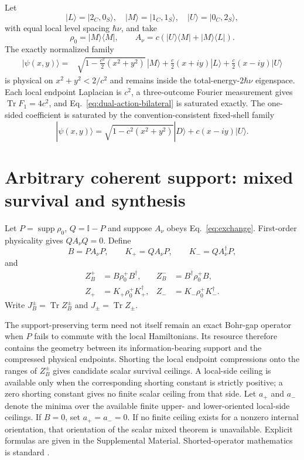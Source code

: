 \documentclass[aps,pra,preprint,nofootinbib]{revtex4-2}
\newcommand{\Tr}{\operatorname{Tr}}
\newcommand{\supp}{\operatorname{supp}}
\newcommand{\id}{\mathbb I}
\newcommand{\rhozero}{\rho_0}
\begin{document}
Let
\begin{equation}
|L\rangle=|2_C,0_S\rangle,\quad
|M\rangle=|1_C,1_S\rangle,\quad
|U\rangle=|0_C,2_S\rangle,
\end{equation}
with equal local level spacing $\hbar\nu$, and take
\begin{equation}
\rhozero=|M\rangle\!\langle M|,
\qquad
A_\nu=c(|U\rangle\!\langle M|+|M\rangle\!\langle L|).
\end{equation}
The exactly normalized family
\begin{align}
|\psi(x,y)\rangle={}&
\sqrt{1-\frac{c^2}{2}(x^2+y^2)}\,|M\rangle
+\frac c2(x+i y)|L\rangle
+\frac c2(x-i y)|U\rangle
\label{eq:bilateral-extremizer}
\end{align}
is physical on $x^2+y^2<2/c^2$ and remains inside the total-energy-$2\hbar\nu$ eigenspace. Each local endpoint Laplacian is $c^2$, a three-outcome Fourier measurement gives $\Tr F_1=4c^2$, and Eq.~\eqref{eq:dual-action-bilateral} is saturated exactly. The one-sided coefficient is saturated by the convention-consistent fixed-shell family
\begin{equation}
|\psi(x,y)\rangle
=\sqrt{1-c^2(x^2+y^2)}|D\rangle+c(x-i y)|U\rangle.
\end{equation}

\section{Arbitrary coherent support: mixed survival and synthesis}
\label{sec:mixed}

Let $P=\supp\rhozero$, $Q=\id-P$ and suppose $A_\nu$ obeys Eq.~\eqref{eq:exchange}. First-order physicality gives $QA_\nu Q=0$. Define
\begin{equation}
B=PA_\nu P,\qquad
K_+=QA_\nu P,\qquad
K_-=QA_\nu^\dagger P,
\label{eq:mixed-decomp}
\end{equation}
and
\begin{align}
Z_B^+&=B\rhozero^+B^\dagger,&Z_B^-&=B^\dagger\rhozero^+B,\\
Z_+&=K_+\rhozero^+K_+^\dagger,&Z_-&=K_-\rhozero^+K_-^\dagger.
\end{align}
Write $J_B^\pm=\Tr Z_B^\pm$ and $J_\pm=\Tr Z_\pm$.

The support-preserving term need not itself remain an exact Bohr-gap operator when $P$ fails to commute with the local Hamiltonians. Its resource therefore contains the geometry between its information-bearing support and the compressed physical endpoints. Shorting the local endpoint compressions onto the ranges of $Z_B^\pm$ gives candidate scalar survival ceilings. A local-side ceiling is available only when the corresponding shorting constant is strictly positive; a zero shorting constant gives no finite scalar ceiling from that side. Let $a_+$ and $a_-$ denote the minima over the available finite upper- and lower-oriented local-side ceilings. If $B=0$, set $a_+=a_-=0$. If no finite ceiling exists for a nonzero internal orientation, that orientation of the scalar mixed theorem is unavailable. Explicit formulas are given in the Supplemental Material. Shorted-operator mathematics is standard \cite{AndersonTrapp1975}.
\end{document}
